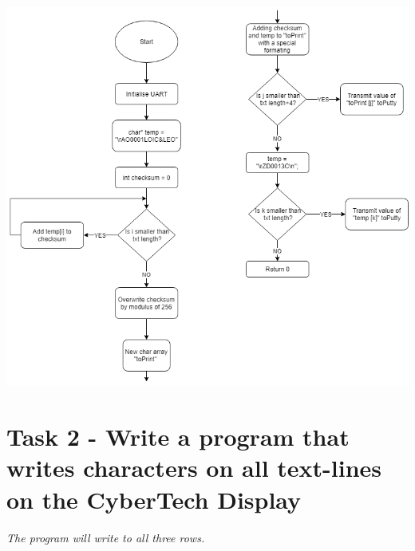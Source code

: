 \documentclass[a4paper,12pt]{article}
\begin{document}
\begin{center}
\includegraphics[scale=0.6]{img/Task1.png}
\end{center}
\newpage
\section{Task 2 - Write a program that writes characters on all text-lines on the CyberTech Display}
\textit{The program will write to all three rows.}
\end{document}
